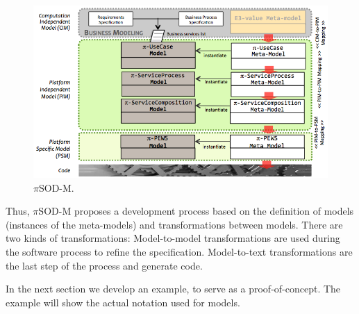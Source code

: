 
\begin{figure}[h]
\centering
\includegraphics[width=1.0\textwidth]{figs/piSODM}
\caption{$\pi$SOD-M.}
\label{fig:piSOD-M}
\end{figure}


%
Thus, $\pi$SOD-M proposes a development process based on the definition of models
(instances of the meta-models) and transformations between models.
There are two kinds of transformations:
Model-to-model transformations are used during the software process to refine the specification.
Model-to-text transformations are the last step of the process and generate code.


In the next section we develop an example, to serve as a proof-of-concept.
The example will show the actual notation used for models. 





